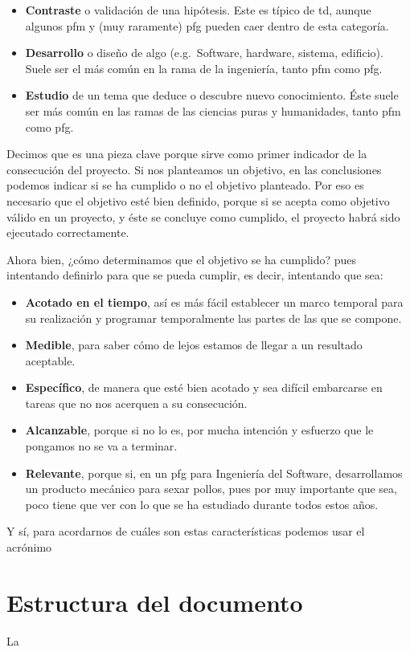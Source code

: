         \begin{itemize}
            \item \textbf{Contraste} o validación de una hipótesis. Este es típico de \gls{td}, aunque algunos \gls{pfm} y (muy raramente) \gls{pfg} pueden caer dentro de esta categoría.
            \item \textbf{Desarrollo} o diseño de algo (e.g.~Software, hardware, sistema, edificio). Suele ser el más común en la rama de la ingeniería, tanto \gls{pfm} como \gls{pfg}.
            \item \textbf{Estudio} de un tema que deduce o descubre nuevo conocimiento. Éste suele ser más común en las ramas de las ciencias puras y humanidades, tanto \gls{pfm} como \gls{pfg}.
        \end{itemize}

        Decimos que es una pieza clave porque sirve como primer indicador de la consecución del proyecto. Si nos planteamos un objetivo, en las conclusiones podemos indicar si se ha cumplido o no el objetivo planteado. Por eso es necesario que el objetivo esté bien definido, porque si se acepta como objetivo válido en un proyecto, y éste se concluye como cumplido, el proyecto habrá sido ejecutado correctamente.

        Ahora bien, ¿cómo determinamos que el objetivo se ha cumplido? pues intentando definirlo para que se pueda cumplir, es decir, intentando que sea:

        \begin{itemize}
            \item \textbf{Acotado en el tiempo}, así es más fácil establecer un marco temporal para su realización y programar temporalmente las partes de las que se compone.
            \item \textbf{Medible}, para saber cómo de lejos estamos de llegar a un resultado aceptable.
            \item \textbf{Específico}, de manera que esté bien acotado y sea difícil embarcarse en tareas que no nos acerquen a su consecución.
            \item \textbf{Alcanzable}, porque si no lo es, por mucha intención y esfuerzo que le pongamos no se va a terminar.
            \item \textbf{Relevante}, porque si, en un \gls{pfg} para Ingeniería del Software, desarrollamos un producto mecánico para sexar pollos, pues por muy importante que sea, poco tiene que ver con lo que se ha estudiado durante todos estos años.
        \end{itemize}

        Y sí, para acordarnos de cuáles son estas características podemos usar el acrónimo %

\section{Estructura del documento}
    La